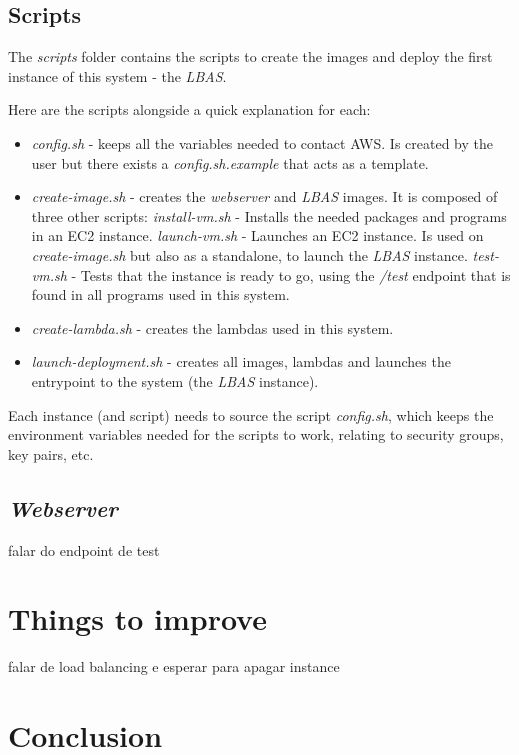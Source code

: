 \documentclass{article}
\begin{document}
\subsection{Scripts}

The \textit{scripts} folder contains the scripts to create the images and deploy
the first instance of this system - the \textit{LBAS}.

Here are the scripts alongside a quick explanation for each:

\begin{itemize}
    \item \textit{config.sh} - keeps all the variables needed to contact AWS. Is
        created by the user but there exists a \textit{config.sh.example} that
        acts as a template.
    \item \textit{create-image.sh} - creates the \textit{webserver} and \textit{LBAS}
        images. It is composed of three other scripts:
    \subitem \textit{install-vm.sh} - Installs the needed packages and programs
        in an EC2 instance.
    \subitem \textit{launch-vm.sh} - Launches an EC2 instance. Is used on
        \textit{create-image.sh} but also as a standalone, to launch the
        \textit{LBAS} instance.
    \subitem \textit{test-vm.sh} - Tests that the instance is ready to go, using
        the \textit{/test} endpoint that is found in all programs used in this
        system.
    \item \textit{create-lambda.sh} - creates the lambdas used in this system.
    \item \textit{launch-deployment.sh} - creates all images, lambdas and
        launches the entrypoint to the system (the \textit{LBAS} instance).
\end{itemize}

Each instance (and script) needs to source the script \textit{config.sh}, which
keeps the environment variables needed for the scripts to work, relating to
security groups, key pairs, etc.

\subsection{\textit{Webserver}}

falar do endpoint de test

\section{Things to improve}

falar de load balancing e esperar para apagar instance

\section{Conclusion}
\end{document}
